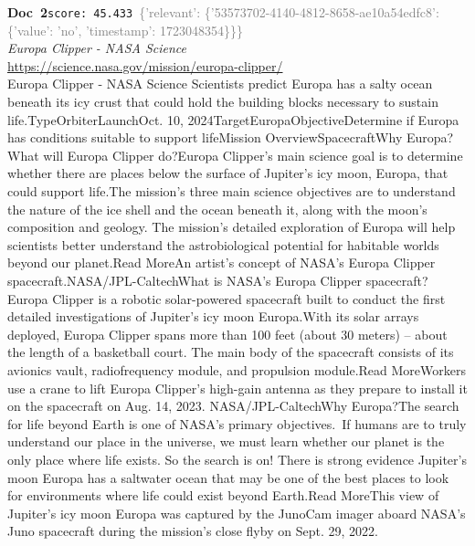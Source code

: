 \documentclass[a4paper,11pt]{article}
\begin{document}
\begin{docenv}
{\footnotesize\textcolor{doccolor}{\textbf{Doc~2}}}\hfill{\tiny\texttt{score:~45.433}}\ {\tiny\textcolor{gray}{\{'relevant': \{'53573702-4140-4812-8658-ae10a54edfc8': \{'value': 'no', 'timestamp': 1723048354\}\}\}}}\\[3pt]
{\small\textit{Europa Clipper - NASA Science}}\\[2pt]
{\tiny\url{https://science.nasa.gov/mission/europa-clipper/}}\\[4pt]
{\footnotesize Europa Clipper - NASA Science
Scientists predict Europa has a salty ocean beneath its icy crust that could hold the building blocks necessary to sustain life.TypeOrbiterLaunchOct. 10, 2024TargetEuropaObjectiveDetermine if Europa has conditions suitable to support lifeMission OverviewSpacecraftWhy Europa?What will Europa Clipper do?Europa Clipper’s main science goal is to determine whether there are places below the surface of Jupiter’s icy moon, Europa, that could support life.The mission’s three main science objectives are to understand the nature of the ice shell and the ocean beneath it, along with the moon’s composition and geology. The mission’s detailed exploration of Europa will help scientists better understand the astrobiological potential for habitable worlds beyond our planet.Read MoreAn artist's concept of NASA’s Europa Clipper spacecraft.NASA/JPL-CaltechWhat is NASA’s Europa Clipper spacecraft?Europa Clipper is a robotic solar-powered spacecraft built to conduct the first detailed investigations of Jupiter's icy moon Europa.With its solar arrays deployed, Europa Clipper spans more than 100 feet (about 30 meters) – about the length of a basketball court. The main body of the spacecraft consists of its avionics vault, radiofrequency module, and propulsion module.Read MoreWorkers use a crane to lift Europa Clipper's high-gain antenna as they prepare to install it on the spacecraft on Aug. 14, 2023. NASA/JPL-CaltechWhy Europa?The search for life beyond Earth is one of NASA’s primary objectives. If humans are to truly understand our place in the universe, we must learn whether our planet is the only place where life exists. So the search is on! There is strong evidence Jupiter's moon Europa has a saltwater ocean that may be one of the best places to look for environments where life could exist beyond Earth.Read MoreThis view of Jupiter’s icy moon Europa was captured by the JunoCam imager aboard NASA’s Juno spacecraft during the mission’s close flyby on Sept. 29, 2022.}
\end{docenv}
\end{document}
